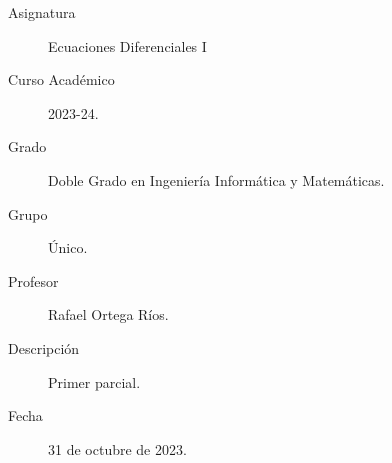 \documentclass[12pt]{article}
\begin{document}

    
    

    \begin{description}
        \item[Asignatura] Ecuaciones Diferenciales I
        \item[Curso Académico] 2023-24.
        \item[Grado] Doble Grado en Ingeniería Informática y Matemáticas.
        \item[Grupo] Único.
        \item[Profesor] Rafael Ortega Ríos.
        \item[Descripción] Primer parcial.
        \item[Fecha] 31 de octubre de 2023.
    
    \end{description}
    \newpage
    
\end{document}
